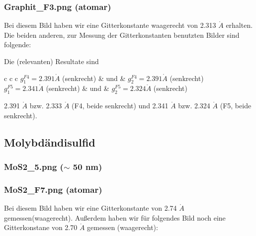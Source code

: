 \subsubsection{Graphit\_F3.png (atomar)}

Bei diesem Bild haben wir eine Gitterkonstante waagerecht von 2.313 $\mathring{A}$ erhalten. Die beiden anderen, zur Messung der Gitterkonstanten benutzten Bilder sind folgende:


Die (relevanten) Resultate sind 
\begin{table}{c c c}
	$g^{F4}_1 = 2.391 \mathring{A}$ (senkrecht) & und & $g^{F4}_2 = 2.391 \mathring{A}$ (senkrecht)\\
	$g^{F5}_1 = 2.341 \mathring{A}$ (senkrecht) & und & $g^{F5}_2 = 2.324 \mathring{A}$ (senkrecht)\\
\end{table}





2.391 $\mathring{A}$ bzw. 2.333 $\mathring{A}$ (F4, beide senkrecht) und 2.341 $\mathring{A}$ bzw. 2.324 $\mathring{A}$ (F5, beide senkrecht).

\subsection{Molybdändisulfid}

\subsubsection{MoS2\_5.png ($\sim$ 50 nm)}
\subsubsection{MoS2\_F7.png (atomar)}

Bei diesem Bild haben wir eine Gitterkonstante von 2.74 $\mathring{A}$ gemessen(waagerecht). Außerdem  haben wir für folgendes Bild noch eine Gitterkonstane von 2.70 $\mathring{A}$ gemessen (waagerecht):

